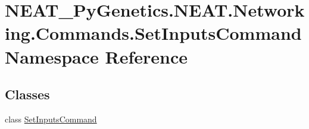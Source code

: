 \hypertarget{namespaceNEAT__PyGenetics_1_1NEAT_1_1Networking_1_1Commands_1_1SetInputsCommand}{}\section{N\+E\+A\+T\+\_\+\+Py\+Genetics.\+N\+E\+A\+T.\+Networking.\+Commands.\+Set\+Inputs\+Command Namespace Reference}
\label{namespaceNEAT__PyGenetics_1_1NEAT_1_1Networking_1_1Commands_1_1SetInputsCommand}
\subsection*{Classes}
\begin{DoxyCompactItemize}
\item 
class \hyperlink{classNEAT__PyGenetics_1_1NEAT_1_1Networking_1_1Commands_1_1SetInputsCommand_1_1SetInputsCommand}{Set\+Inputs\+Command}
\end{DoxyCompactItemize}
